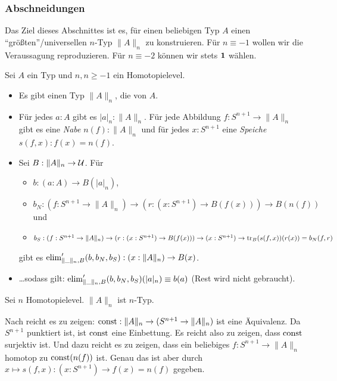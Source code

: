 \subsubsection*{Abschneidungen}
Das Ziel dieses Abschnittes ist es, für einen beliebigen Typ \(A\) einen ``größten''/universellen \(n\)-Typ \(\|A\|_n\) zu konstruieren.
Für \(n\equiv -1\) wollen wir die Veraussagung reproduzieren.
Für \(n\equiv -2\) können wir stets \(\mathbf{1}\) wählen.

\begin{regeln}
  Sei \(A\) ein Typ und \(n, n\geq -1\) ein Homotopielevel.
  \begin{itemize}
  \item Es gibt einen Typ \(\|A\|_n\), die  von \(A\).
  \item Für jedes \(a:A\) gibt es \(|a|_n:\|A\|_n\).
    Für jede Abbildung \(f:S^{n+1}\to \|A\|_n\) gibt es eine \emph{Nabe} \(n(f):\|A\|_n\)
    und für jedes \(x:S^{n+1}\) eine \emph{Speiche} \(s(f,x):f(x)=n(f)\).
  \item Sei \(B:\|A\|_n\to\mathcal{U}\).
    Für
    \begin{itemize}
    \item \(b:(a:A)\to B(|a|_n)\),
    \item \(b_N:(f:S^{n+1}\to \|A\|_n)\to (r:(x:S^{n+1})\to B(f(x))) \to B(n(f))\) und
    \item \(b_S:(f:S^{n+1}\to \|A\|_n)\to (r:(x:S^{n+1})\to B(f(x))) \to (x: S^{n+1})\to \mathrm{tr}_B(s(f,x))(r(x))=b_N(f,r)\)
    \end{itemize}
    gibt es \(\mathrm{elim}_{\|\_\|_n,B}^\prime(b,b_N,b_S):(x:\|A\|_n)\to B(x)\).
  \item \dots sodass gilt: \(\mathrm{elim}_{\|\_\|_n,B}^\prime(b,b_N,b_S)(|a|_n)\equiv b(a)\) (Rest wird nicht gebraucht).
  \end{itemize}
\end{regeln}

\begin{bemerkung}
  Sei \(n\) Homotopielevel.
  \(\|A\|_n\) ist \(n\)-Typ.
\end{bemerkung}

\begin{beweis}
  Nach  reicht es zu zeigen: \(\mathrm{const}:\|A\|_n\to (S^{n+1}\to \|A\|_n)\) ist eine Äquivalenz.
  Da \(S^{n+1}\) punktiert ist, ist \(\mathrm{const}\) eine Einbettung.
  Es reicht also zu zeigen, dass \(\mathrm{const}\) surjektiv ist.
  Und dazu reicht es zu zeigen, dass ein beliebiges \(f:S^{n+1}\to\|A\|_n\) homotop zu \(\mathrm{const}(n(f))\) ist. Genau das ist aber durch \(x\mapsto s(f,x):(x:S^{n+1})\to f(x)=n(f)\) gegeben.
\end{beweis}

